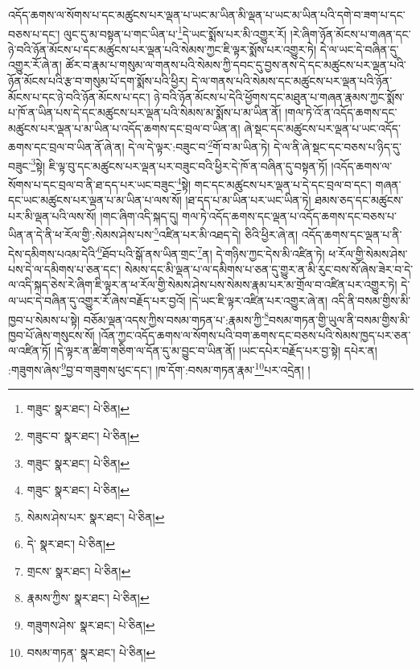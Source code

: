 འདོད་ཆགས་ལ་སོགས་པ་དང་མཚུངས་པར་ལྡན་པ་ཡང་མ་ཡིན་མི་ལྡན་པ་ཡང་མ་ཡིན་པའི་དགེ་བ་ཟག་པ་དང་བཅས་པ་དང་། ལུང་དུ་མ་བསྟན་པ་གང་ཡིན་པ་\footnote{གཟུང་  སྣར་ཐང་།  པེ་ཅིན། }དེ་ཡང་སྨོས་པར་མི་འགྱུར་རོ། །རེ་ཞིག་ཉོན་མོངས་པ་གཞན་དང་ཉེ་བའི་ཉོན་མོངས་པ་དང་མཚུངས་པར་ལྡན་པའི་སེམས་ཀྱང་ཇི་ལྟར་སྨོས་པར་འགྱུར་ཏེ། དེ་ལ་ཡང་དེ་བཞིན་དུ་འགྱུར་རོ་ཞེ་ན། ཚོར་བ་རྣམ་པ་གསུམ་ལ་གནས་པའི་སེམས་ཀྱི་དབང་དུ་བྱས་ནས་དེ་དང་མཚུངས་པར་ལྡན་པའི་ཉོན་མོངས་པའི་རྩ་བ་གསུམ་པོ་དག་སྨོས་པའི་ཕྱིར། དེ་ལ་གནས་པའི་སེམས་དང་མཚུངས་པར་ལྡན་པའི་ཉོན་མོངས་པ་དང་ཉེ་བའི་ཉོན་མོངས་པ་དང་། ཉེ་བའི་ཉོན་མོངས་པ་དེའི་ཕྱོགས་དང་མཐུན་པ་གཞན་རྣམས་ཀྱང་སྨོས་པ་ཁོ་ན་ཡིན་པས་དེ་དང་མཚུངས་པར་ལྡན་པའི་སེམས་མ་སྨོས་པ་མ་ཡིན་ནོ། །གལ་ཏེ་འོ་ན་འདོད་ཆགས་དང་མཚུངས་པར་ལྡན་པ་མ་ཡིན་པ་འདོད་ཆགས་དང་བྲལ་བ་ཡིན་ན། ཞེ་སྡང་དང་མཚུངས་པར་ལྡན་པ་ཡང་འདོད་ཆགས་དང་བྲལ་བ་ཡིན་ནོ་ཞེ་ན། དེ་ལ་དེ་ལྟར་:བཟུང་བ་\footnote{གཟུང་བ་  སྣར་ཐང་།  པེ་ཅིན། }གོ་བ་མ་ཡིན་ཏེ། དེ་ལ་ནི་ཞེ་སྡང་དང་བཅས་པ་ཉིད་དུ་བཟུང་\footnote{གཟུང་  སྣར་ཐང་།  པེ་ཅིན། }སྟེ། ཇི་ལྟ་བུ་དང་མཚུངས་པར་ལྡན་པར་བཟུང་བའི་ཕྱིར་དེ་ཁོ་ན་བཞིན་དུ་བསྟན་ཏོ། །འདོད་ཆགས་ལ་སོགས་པ་དང་བྲལ་བ་ནི་ཐ་དད་པར་ཡང་བཟུང་\footnote{གཟུང་  སྣར་ཐང་།  པེ་ཅིན། }སྟེ། གང་དང་མཚུངས་པར་ལྡན་པ་དེ་དང་བྲལ་བ་དང་། གཞན་དང་ཡང་མཚུངས་པར་ལྡན་པ་མ་ཡིན་པ་ལས་སོ། །ཐ་དད་པ་མ་ཡིན་པར་ཡང་ཡིན་ཏེ། ཐམས་ཅད་དང་མཚུངས་པར་མི་ལྡན་པའི་ལས་སོ། །གང་ཞིག་འདི་སྐད་དུ། གལ་ཏེ་འདོད་ཆགས་དང་ལྡན་པ་འདོད་ཆགས་དང་བཅས་པ་ཡིན་ན་དེ་ནི་ཕ་རོལ་གྱི་:སེམས་ཤེས་པས་\footnote{སེམས་ཤེས་པར་  སྣར་ཐང་།  པེ་ཅིན། }འཛིན་པར་མི་འཐད་དེ། ཅིའི་ཕྱིར་ཞེ་ན། འདོད་ཆགས་དང་ལྡན་པ་ནི་དེས་དམིགས་པའམ་དེའི་\footnote{དེ་  སྣར་ཐང་།  པེ་ཅིན། }ཐོབ་པའི་སྒོ་ནས་ཡིན་གྲང་\footnote{གྲངས་  སྣར་ཐང་།  པེ་ཅིན། }ན། དེ་གཉིས་ཀྱང་དེས་མི་འཛིན་ཏེ། ཕ་རོལ་གྱི་སེམས་ཤེས་པས་དེ་ལ་དམིགས་པ་ཅན་དང་། སེམས་དང་མི་ལྡན་པ་ལ་དམིགས་པ་ཅན་དུ་གྱུར་ན་མི་རུང་བས་སོ་ཞེས་ཟེར་བ་དེ་ལ་འདི་སྐད་ཅེས་རེ་ཞིག་ཇི་ལྟར་ན་ཕ་རོལ་གྱི་སེམས་ཤེས་པས་སེམས་རྣམ་པར་མ་གྲོལ་བ་འཛིན་པར་འགྱུར་ཏེ། དེ་ལ་ཡང་དེ་བཞིན་དུ་འགྱུར་རོ་ཞེས་བརྗོད་པར་བྱའོ། །དེ་ཡང་ཇི་ལྟར་འཛིན་པར་འགྱུར་ཞེ་ན། འདི་ནི་བསམ་གྱིས་མི་ཁྱབ་པ་སེམས་པ་སྟེ། བཅོམ་ལྡན་འདས་ཀྱིས་བསམ་གཏན་པ་:རྣམས་ཀྱི་\footnote{རྣམས་ཀྱིས་  སྣར་ཐང་།  པེ་ཅིན། }བསམ་གཏན་གྱི་ཡུལ་ནི་བསམ་གྱིས་མི་ཁྱབ་པོ་ཞེས་གསུངས་སོ། །འོན་ཀྱང་འདོད་ཆགས་ལ་སོགས་པའི་བག་ཆགས་དང་བཅས་པའི་སེམས་ཁྱད་པར་ཅན་ལ་འཛིན་ཏོ། །དེ་ལྟར་ན་ཚིག་གཅིག་ལ་དོན་དུ་མ་བྱུང་བ་ཡིན་ནོ། །ཡང་དཔེར་བརྗོད་པར་བྱ་སྟེ། དཔེར་ན། :གཟུགས་ཞེས་\footnote{གཟུགས་ཤེས་  སྣར་ཐང་།  པེ་ཅིན། }བྱ་བ་གཟུགས་ཕུང་དང་། །ཁ་དོག་:བསམ་གཏན་རྣམ་\footnote{བསམ་གཏན་  སྣར་ཐང་།  པེ་ཅིན། }པར་འདྲེན། །
